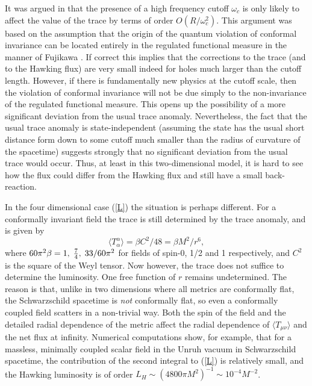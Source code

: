 \documentclass[12pt]{article}
\def\o{\omega}
\def\la{\langle}
\def\ra{\rangle}
\begin{document}
It was argued in \cite{Jac} that the presence of a high
frequency cutoff $\o_c$ is only likely to affect the
value of the trace by terms of order $O(R/\o_c^2)$.
This argument was based on the assumption that the
origin of the quantum violation of conformal invariance
can be located entirely in the regulated functional
measure in the manner of Fujikawa \cite{Fuji}.
If correct this implies that the corrections to the
trace (and to the Hawking flux) are very small indeed for
holes much larger than the cutoff length.
However, if there is fundamentally new physics at the
cutoff scale, then the violation of conformal
invariance will not be due simply to the non-invariance
of the regulated functional measure. This opens up the
possibility of a more significant deviation from the usual
trace anomaly. Nevertheless, the fact that the usual trace
anomaly is state-independent (assuming the state has the usual short
distance form down to some cutoff much smaller than the
radius of curvature of the spacetime) suggests strongly
that no significant deviation from the usual trace would occur.
Thus, at least in this two-dimensional model, it is hard to see
how the flux could differ from the Hawking flux and still have a small
back-reaction.

In the four dimensional case (\ref{L}) the situation is
perhaps different. For a conformally invariant field the trace is
still determined by the trace anomaly, and is given by
\begin{equation}
\la T_\alpha^\alpha\ra =\beta C^2/48=\beta M^2/r^6,
\label{trace}
\end{equation}
where $60\pi^2\beta=1,\; {7\over 4},\;
33/60\pi^2$ for fields of spin-0, 1/2 and 1
respectively, and $C^2$ is the square of the Weyl tensor.
Now however, the trace does not suffice to determine the luminosity.
One free function of $r$ remains undetermined.
The reason is that, unlike in two
dimensions where all metrics are conformally flat, the
Schwarzschild spacetime is {\it not} conformally flat,
so even a conformally coupled field scatters in a
non-trivial way. Both the spin of the field and the
detailed radial dependence of the metric affect the
radial dependence of $\la T_{\mu\nu}\ra$ and the net
flux at infinity.
Numerical computations \cite{Jensen} show, for example, that for
a massless, minimally coupled scalar field in the Unruh
vacuum in Schwarzschild spacetime,
the contribution of the second integral to (\ref{L})
is relatively small, and the Hawking luminosity is of order
$L_H\sim (4800\pi M^2)^{-1}\sim 10^{-4}M^{-2}$.
\end{document}
